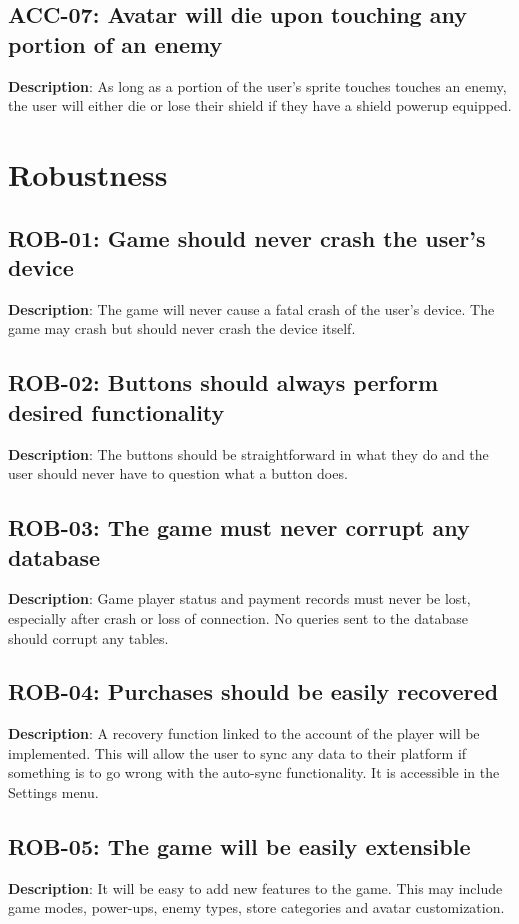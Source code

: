 \subsection{ACC-07: Avatar will die upon touching any portion of an enemy}
\textbf{Description}: As long as a portion of the user\textquoteright{}s sprite
touches touches an enemy, the user will either die or lose their shield
if they have a shield powerup equipped.
\section{Robustness}
\subsection{ROB-01: Game should never crash the user\textquoteright{}s device}
\textbf{Description}: The game will never cause a fatal crash of the user\textquoteright{}s
device. The game may crash but should never crash the device itself.
\subsection{ROB-02: Buttons should always perform desired functionality}
\textbf{Description}: The buttons should be straightforward in what they do
and the user should never have to question what a button does.
\subsection{ROB-03: The game must never corrupt any database}
\textbf{Description}: Game player status and payment records must never be
lost, especially after crash or loss of connection. No queries sent
to the database should corrupt any tables.
\subsection{ROB-04: Purchases should be easily recovered}
\textbf{Description}: A recovery function linked to the account of the player
will be implemented. This will allow the user to sync any data to
their platform if something is to go wrong with the auto-sync functionality.
It is accessible in the Settings menu.
\subsection{ROB-05: The game will be easily extensible}
\textbf{Description}: It will be easy to add new features to the game. This
may include game modes, power-ups, enemy types, store categories and
avatar customization.

